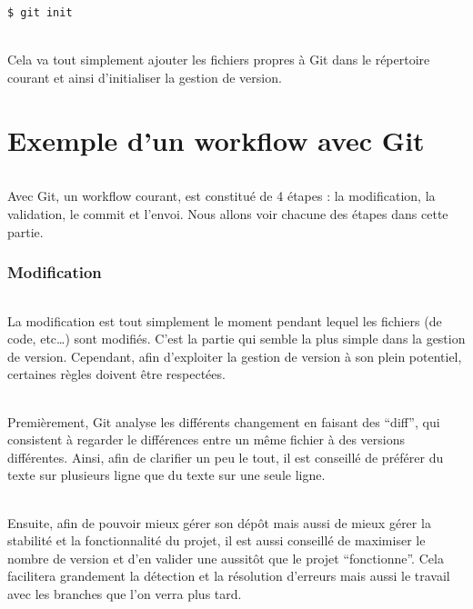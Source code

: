 \documentclass[french, a4paper, 12pt, titlepage]{article}
\begin{document}
\begin{lstlisting}
$ git init
\end{lstlisting}

\paragraph{} Cela va tout simplement ajouter les fichiers propres à Git dans le
répertoire courant et ainsi d'initialiser la gestion de version.

\part{Exemple d'un workflow avec Git}

\paragraph{} Avec Git, un workflow courant, est constitué de 4 étapes : la
modification, la validation, le commit et l'envoi. Nous allons voir chacune des
étapes dans cette partie.

\section{Modification}

\paragraph{} La modification est tout simplement le moment pendant lequel les
fichiers (de code, etc\dots) sont modifiés. C'est la partie qui semble la plus
simple dans la gestion de version. Cependant, afin d'exploiter la gestion de
version à son plein potentiel, certaines règles doivent être respectées.

\paragraph{} Premièrement, Git analyse les différents changement en faisant des
``diff'', qui consistent à regarder le différences entre un même fichier à des
versions différentes. Ainsi, afin de clarifier un peu le tout, il est conseillé
de préférer du texte sur plusieurs ligne que du texte sur une seule ligne.

\paragraph{} Ensuite, afin de pouvoir mieux gérer son dépôt mais aussi de mieux
gérer la stabilité et la fonctionnalité du projet, il est aussi conseillé de
maximiser le nombre de version et d'en valider une aussitôt que le projet
``fonctionne''. Cela facilitera grandement la détection et la résolution
d'erreurs mais aussi le travail avec les branches que l'on verra plus tard.

%
%
\end{document}
